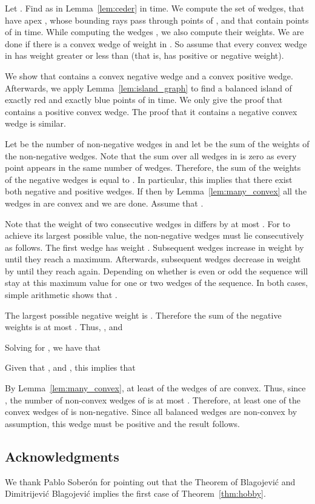 \documentclass{article}
\def\QED{\ensuremath{{\square}}}
\def\markatright#1{\leavevmode\unskip\nobreak\quad\hspace*{\fill}{#1}}
\newenvironment{proof}
  {\begin{trivlist}\item[\hskip\labelsep{\bf Proof.}]}
  {\markatright{\QED}\end{trivlist}}
\begin{document}
\begin{proof}
Let .
Find  as in Lemma~\ref{lem:ceder} in  time. 
We compute the set of wedges,  that have apex , whose bounding rays pass through points of , and that contain  points of  in  time.
While computing the wedges , we also compute their weights.
We are done if there is a convex wedge of weight  in . 
So assume that every convex wedge in  has weight greater or less than  (that is, has positive or negative weight). 

We show that  contains a convex negative wedge and a convex positive wedge.
Afterwards, we apply Lemma~\ref{lem:island_graph} to find a balanced island of exactly  red 
	and exactly  blue points of  in   time.
We only give the proof that  contains a positive convex wedge. 
The proof that it contains a negative convex wedge is similar. 
 
Let  be the number of non-negative wedges in  and let   be the sum of the weights of the non-negative wedges.
Note that the sum over all wedges in  is zero as every point appears in the same number of wedges. 
Therefore, the sum of the weights of the negative wedges is equal to . 
In particular, this implies that there exist both negative and positive wedges.  
If  then by Lemma~\ref{lem:many_convex} all the wedges in  are convex and we are done.  
Assume that .

Note that the weight of two consecutive wedges in  differs by at most . 
For  to achieve its largest possible value, the non-negative wedges must lie consecutively as follows.  
The first wedge has weight .
Subsequent wedges increase in weight by  until they reach a maximum. 
Afterwards, subsequent wedges decrease in weight by  until they reach  again. 
Depending on whether  is even or odd the sequence will stay at this maximum value for one or two wedges of the sequence. 
In both cases, simple arithmetic shows that . 

The largest possible negative weight is . 
Therefore the sum of the negative weights is at most . 
Thus, , and 
		 
Solving for , we have that  
		 
Given that ,  and , this implies that 
	 
By Lemma~\ref{lem:many_convex}, at least  of the wedges of  are convex. 
Thus, since , 
	the number of non-convex wedges of  is at most .  
Therefore, at least one of the convex wedges of  is non-negative.
Since all balanced wedges are non-convex by assumption, this wedge must be positive and the result follows.
\end{proof}

\subsection*{Acknowledgments}

We thank Pablo Sober\'on for pointing out that the Theorem of Blagojevi\'c and Dimitrijevi\'c Blagojevi\'c
implies the first case of Theorem~\ref{thm:hobby}.

\small 


\end{document}
